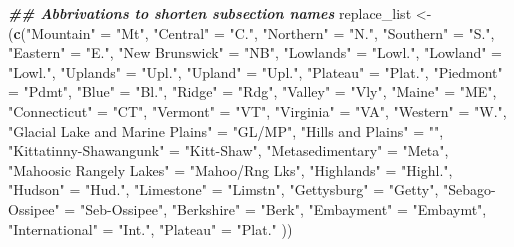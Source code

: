 \documentclass[
]{book}
\newenvironment{Shaded}{\begin{snugshade}}{\end{snugshade}}
\newcommand{\DocumentationTok}[1]{\textcolor[rgb]{0.56,0.35,0.01}{\textbf{\textit{#1}}}}
\newcommand{\FunctionTok}[1]{\textcolor[rgb]{0.13,0.29,0.53}{\textbf{#1}}}
\newcommand{\NormalTok}[1]{#1}
\newcommand{\OtherTok}[1]{\textcolor[rgb]{0.56,0.35,0.01}{#1}}
\newcommand{\StringTok}[1]{\textcolor[rgb]{0.31,0.60,0.02}{#1}}
\begin{document}
\begin{Shaded}
\begin{Highlighting}[]
\DocumentationTok{\#\# Abbrivations to shorten subsection names}
\NormalTok{replace\_list }\OtherTok{\textless{}{-}}\NormalTok{ (}\FunctionTok{c}\NormalTok{(}\StringTok{"Mountain"} \OtherTok{=} \StringTok{"Mt"}\NormalTok{, }
                  \StringTok{"Central"} \OtherTok{=} \StringTok{"C."}\NormalTok{, }
                  \StringTok{"Northern"} \OtherTok{=} \StringTok{"N."}\NormalTok{,}
                  \StringTok{"Southern"} \OtherTok{=} \StringTok{"S."}\NormalTok{,}
                  \StringTok{"Eastern"} \OtherTok{=} \StringTok{"E."}\NormalTok{,}
                  \StringTok{"New Brunswick"} \OtherTok{=} \StringTok{"NB"}\NormalTok{,}
                  \StringTok{"Lowlands"} \OtherTok{=} \StringTok{"Lowl."}\NormalTok{,}
                  \StringTok{"Lowland"} \OtherTok{=} \StringTok{"Lowl."}\NormalTok{,}
                  \StringTok{"Uplands"} \OtherTok{=} \StringTok{"Upl."}\NormalTok{,}
                  \StringTok{"Upland"} \OtherTok{=} \StringTok{"Upl."}\NormalTok{,}
                  \StringTok{"Plateau"} \OtherTok{=} \StringTok{"Plat."}\NormalTok{,}
                  \StringTok{"Piedmont"} \OtherTok{=} \StringTok{"Pdmt"}\NormalTok{,}
                  \StringTok{"Blue"} \OtherTok{=} \StringTok{"Bl."}\NormalTok{,}
                  \StringTok{"Ridge"} \OtherTok{=} \StringTok{"Rdg"}\NormalTok{,}
                  \StringTok{"Valley"} \OtherTok{=} \StringTok{"Vly"}\NormalTok{,}
                  \StringTok{"Maine"} \OtherTok{=} \StringTok{"ME"}\NormalTok{,}
                  \StringTok{"Connecticut"} \OtherTok{=} \StringTok{"CT"}\NormalTok{,}
                  \StringTok{"Vermont"} \OtherTok{=} \StringTok{"VT"}\NormalTok{,}
                  \StringTok{"Virginia"} \OtherTok{=} \StringTok{"VA"}\NormalTok{,}
                  \StringTok{"Western"} \OtherTok{=} \StringTok{"W."}\NormalTok{,}
                  \StringTok{"Glacial Lake and Marine Plains"} \OtherTok{=} \StringTok{"GL/MP"}\NormalTok{,}
                  \StringTok{"Hills and Plains"} \OtherTok{=} \StringTok{""}\NormalTok{,}
                  \StringTok{"Kittatinny{-}Shawangunk"} \OtherTok{=} \StringTok{"Kitt{-}Shaw"}\NormalTok{,}
                  \StringTok{"Metasedimentary"} \OtherTok{=} \StringTok{"Meta"}\NormalTok{,}
                  \StringTok{"Mahoosic Rangely Lakes"} \OtherTok{=} \StringTok{"Mahoo/Rng Lks"}\NormalTok{,}
                  \StringTok{"Highlands"} \OtherTok{=} \StringTok{"Highl."}\NormalTok{,}
                  \StringTok{"Hudson"} \OtherTok{=} \StringTok{"Hud."}\NormalTok{,}
                  \StringTok{"Limestone"} \OtherTok{=} \StringTok{"Limstn"}\NormalTok{,}
                  \StringTok{"Gettysburg"} \OtherTok{=} \StringTok{"Getty"}\NormalTok{,}
                  \StringTok{"Sebago{-}Ossipee"} \OtherTok{=} \StringTok{"Seb{-}Ossipee"}\NormalTok{,}
                  \StringTok{"Berkshire"} \OtherTok{=} \StringTok{"Berk"}\NormalTok{,}
                  \StringTok{"Embayment"} \OtherTok{=} \StringTok{"Embaymt"}\NormalTok{,}
                  \StringTok{"International"} \OtherTok{=} \StringTok{"Int."}\NormalTok{,}
                  \StringTok{"Plateau"} \OtherTok{=} \StringTok{"Plat."}
\NormalTok{                  ))}


\end{Highlighting}
\end{Shaded}
\end{document}
